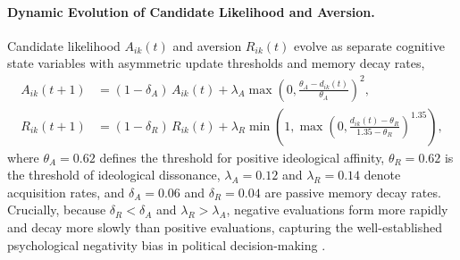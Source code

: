 \documentclass{article}
\begin{document}
\paragraph{Dynamic Evolution of Candidate Likelihood and Aversion.}
Candidate likelihood $A_{ik}(t)$ and aversion $R_{ik}(t)$ evolve as separate cognitive state variables with asymmetric update thresholds and memory decay rates,
\begin{align}
    A_{ik}(t+1) &= (1 - \delta_A)\,A_{ik}(t) + \lambda_A \max\!\left(0, \frac{\theta_A - d_{ik}(t)}{\theta_A}\right)^2, \label{eq:adm_dynamics} \\
    R_{ik}(t+1) &= (1 - \delta_R)\,R_{ik}(t) + \lambda_R \min\!\left(1, \max\!\left(0, \frac{d_{ik}(t) - \theta_R}{1.35 - \theta_R}\right)^{1.35}\right), \label{eq:rej_dynamics}
\end{align}
where $\theta_A = 0.62$ defines the threshold for positive ideological affinity, $\theta_R = 0.62$ is the threshold of ideological dissonance, $\lambda_A = 0.12$ and $\lambda_R = 0.14$ denote acquisition rates, and $\delta_A = 0.06$ and $\delta_R = 0.04$ are passive memory decay rates. Crucially, because $\delta_R < \delta_A$ and $\lambda_R > \lambda_A$, negative evaluations form more rapidly and decay more slowly than positive evaluations, capturing the well-established psychological negativity bias in political decision-making \citep{soroka2014negativity, lau2007effects}.
\end{document}
